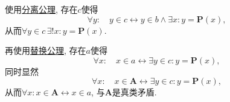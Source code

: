 
使用\href{01 ZFC 公理#nameddest=sec:分离公理模式}{分离公理}, 存在$c$使得
\[
    \forall y:\quad y\in c\leftrightarrow y\in b\land\exists x:y=\mathbf{P}(x),
\]
从而$\forall y\in c\,\exists! x:y=\mathbf{P}(x)$.

再使用\href{01 ZFC 公理#nameddest=sec:替换公理模式}{替换公理}, 存在$a$使得
\[
    \forall x:\quad x\in a\leftrightarrow\exists y\in c:y=\mathbf{P}(x),
\]
同时显然
\[
    \forall x:\quad x\in\mathbf{A}\leftrightarrow\exists y\in c:y=\mathbf{P}(x),
\]
从而$\forall x:x\in\mathbf{A}\leftrightarrow x\in a$, 与$\mathbf{A}$是真类矛盾.

